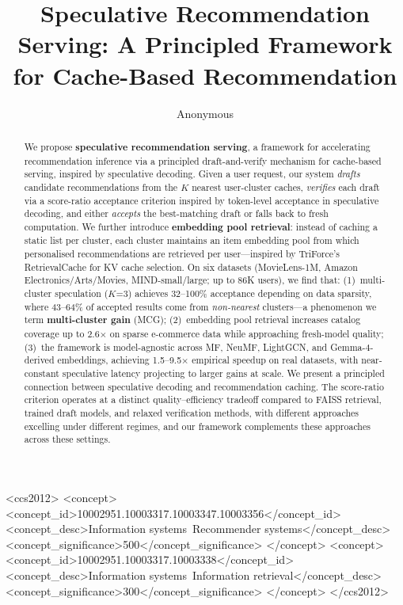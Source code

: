 \documentclass[sigconf,nonacm=false]{acmart}
\begin{document}
\title{Speculative Recommendation Serving: A Principled Framework for Cache-Based Recommendation}

\author{Anonymous}

\begin{abstract}
We propose \textbf{speculative recommendation serving}, a framework for accelerating recommendation inference via a principled draft-and-verify mechanism for cache-based serving, inspired by speculative decoding.
Given a user request, our system \emph{drafts} candidate recommendations from the $K$ nearest user-cluster caches, \emph{verifies} each draft via a score-ratio acceptance criterion inspired by token-level acceptance in speculative decoding, and either \emph{accepts} the best-matching draft or falls back to fresh computation.
We further introduce \textbf{embedding pool retrieval}: instead of caching a static list per cluster, each cluster maintains an item embedding pool from which personalised recommendations are retrieved per user---inspired by TriForce's RetrievalCache for KV cache selection.
On six datasets (MovieLens-1M, Amazon Electronics/Arts/Movies, MIND-small/large; up to 86K users), we find that:
(1)~multi-cluster speculation ($K$=3) achieves 32--100\% acceptance depending on data sparsity, where 43--64\% of accepted results come from \emph{non-nearest} clusters---a phenomenon we term \textbf{multi-cluster gain} (MCG);
(2)~embedding pool retrieval increases catalog coverage up to 2.6$\times$ on sparse e-commerce data while approaching fresh-model quality;
(3)~the framework is model-agnostic across MF, NeuMF, LightGCN, and Gemma-4-derived embeddings, achieving 1.5--9.5$\times$ empirical speedup on real datasets, with near-constant speculative latency projecting to larger gains at scale.
We present a principled connection between speculative decoding and recommendation caching. The score-ratio criterion operates at a distinct quality--efficiency tradeoff compared to FAISS retrieval, trained draft models, and relaxed verification methods, with different approaches excelling under different regimes, and our framework complements these approaches across these settings.
\end{abstract}

\begin{CCSXML}
<ccs2012>
<concept>
<concept_id>10002951.10003317.10003347.10003356</concept_id>
<concept_desc>Information systems~Recommender systems</concept_desc>
<concept_significance>500</concept_significance>
</concept>
<concept>
<concept_id>10002951.10003317.10003338</concept_id>
<concept_desc>Information systems~Information retrieval</concept_desc>
<concept_significance>300</concept_significance>
</concept>
</ccs2012>
\end{CCSXML}
\end{document}
